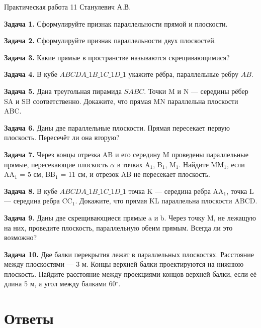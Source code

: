 \documentclass{umk-matematika}
\begin{document}
\maketitlepage
    {Практическая работа 11}
    {}
    {Станулевич А.В.}

\textbf{Задача 1.} Сформулируйте признак параллельности прямой и плоскости.\par\vspace{10pt}
\textbf{Задача 2.} Сформулируйте признак параллельности двух плоскостей.\par\vspace{10pt}
\textbf{Задача 3.} Какие прямые в пространстве называются скрещивающимися?\par\vspace{10pt}
\textbf{Задача 4.} В кубе $ABCDA\_1B\_1C\_1D\_1$ укажите рёбра, параллельные ребру $AB$.\par\vspace{10pt}
\textbf{Задача 5.} Дана треугольная пирамида $SABC$. Точки M и N — середины рёбер SA и SB соответственно. Докажите, что прямая MN параллельна плоскости ABC.\par\vspace{10pt}
\textbf{Задача 6.} Даны две параллельные плоскости. Прямая пересекает первую плоскость. Пересечёт ли она вторую?\par\vspace{10pt}
\textbf{Задача 7.} Через концы отрезка AB и его середину M проведены параллельные прямые, пересекающие плоскость $\alpha$ в точках A$_1$, B$_1$, M$_1$. Найдите MM$_1$, если AA$_1$ = 5 см, BB$_1$ = 11 см, и отрезок AB не пересекает плоскость.\par\vspace{10pt}
\textbf{Задача 8.} В кубе $ABCDA\_1B\_1C\_1D\_1$ точка K — середина ребра AA$_1$, точка L — середина ребра CC$_1$. Докажите, что прямая KL параллельна плоскости ABCD.\par\vspace{10pt}
\textbf{Задача 9.} Даны две скрещивающиеся прямые a и b. Через точку M, не лежащую на них, проведите плоскость, параллельную обеим прямым. Всегда ли это возможно?\par\vspace{10pt}
\textbf{Задача 10.} Две балки перекрытия лежат в параллельных плоскостях. Расстояние между плоскостями — 3 м. Концы верхней балки проектируются на нижнюю плоскость. Найдите расстояние между проекциями концов верхней балки, если её длина 5 м, а угол между балками 60$^\circ$.\par\vspace{10pt}
\newpage
\section*{Ответы}
\end{document}
